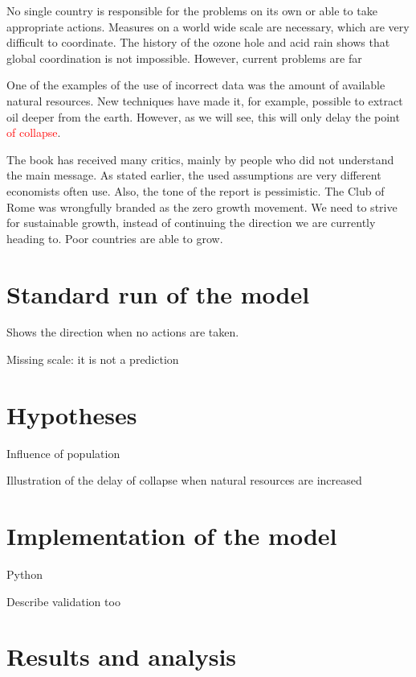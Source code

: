 \documentclass[10pt,a4paper]{scrartcl}
\begin{document}
No single country is responsible for the problems on its own or able to take appropriate actions. Measures on a world wide scale are necessary, which are very difficult to coordinate. The history of the ozone hole and acid rain shows that global coordination is not impossible. However, current problems are far 

One of the examples of the use of incorrect data was the amount of available natural resources. New techniques have made it, for example, possible to extract oil deeper from the earth. However, as we will see, this will only delay the point \textcolor{red}{of collapse}.

The book has received many critics, mainly by people who did not understand the main message. As stated earlier, the used assumptions are very different economists often use. Also, the tone of the report is pessimistic. The Club of Rome was wrongfully branded as the zero growth movement. We need to strive for sustainable growth, instead of continuing the direction we are currently heading to. Poor countries are able to grow.




\section*{Standard run of the model}

Shows the direction when no actions are taken.

Missing scale: it is not a prediction

\section*{Hypotheses}

Influence of population

Illustration of the delay of collapse when natural resources are increased

\section*{Implementation of the model}

Python

Describe validation too

\section*{Results and analysis}
\end{document}
